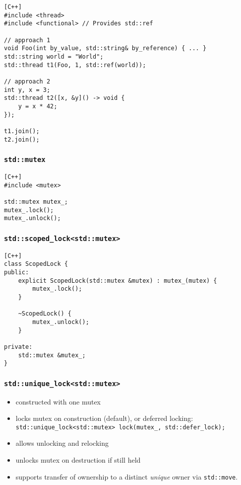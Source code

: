 \documentclass[twocolumn,landscape,10pt]{article}
\theoremstyle{definition}
\begin{document}
\begin{lstlisting}[C++]
#include <thread>
#include <functional> // Provides std::ref

// approach 1
void Foo(int by_value, std::string& by_reference) { ... }
std::string world = "World";
std::thread t1(Foo, 1, std::ref(world));

// approach 2
int y, x = 3;
std::thread t2([x, &y]() -> void {
    y = x * 42;
});

t1.join();
t2.join();
\end{lstlisting}

\subsubsection{\texttt{std::mutex}}

\begin{lstlisting}[C++]
#include <mutex>

std::mutex mutex_;
mutex_.lock();
mutex_.unlock();
\end{lstlisting}

\subsubsection{\texttt{std::scoped\_lock<std::mutex>}}

\begin{lstlisting}[C++]
class ScopedLock {
public:
    explicit ScopedLock(std::mutex &mutex) : mutex_(mutex) {
        mutex_.lock();
    }

    ~ScopedLock() {
        mutex_.unlock();
    }

private:
    std::mutex &mutex_;
}
\end{lstlisting}

\subsubsection{\texttt{std::unique\_lock<std::mutex>}}

\begin{itemize}
    \item constructed with one mutex
    \item locks mutex on construction (default), or deferred locking:
        \\\texttt{std::unique\_lock<std::mutex> lock(mutex\_, std::defer\_lock);}
    \item allows unlocking and relocking
    \item unlocks mutex on destruction if still held
    \item supports transfer of ownership to a distinct \emph{unique} 
        owner via \texttt{std::move}.
\end{itemize} 
\end{document}
